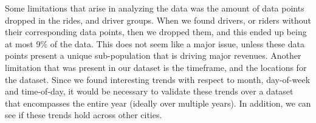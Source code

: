 \documentclass{report}
\begin{document}
	Some limitations that arise in analyzing the data was the amount of data points dropped in the rides, and driver groups. When we found drivers, or riders without their corresponding data points, then we dropped them, and this ended up being at most 9\% of the data. This does not seem like a major issue, unless these data points present a unique sub-population that is driving major revenues. Another limitation that was present in our dataset is the timeframe, and the locations for the dataset. Since we found interesting trends with respect to month, day-of-week and time-of-day, it would be necessary to validate these trends over a dataset that encompasses the entire year (ideally over multiple years). In addition, we can see if these trends hold across other cities.
\end{document}
